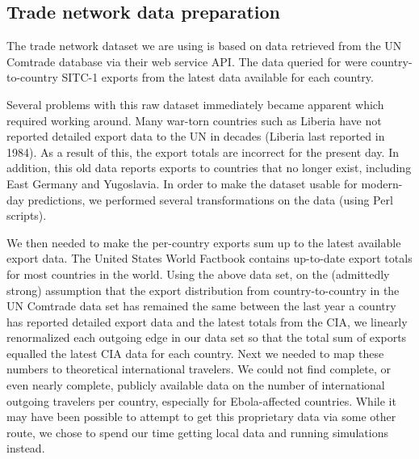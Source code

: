 \documentclass[10pt, journal,onecolumn]{IEEEtran}
\begin{document}
\subsection{{Trade network data preparation}}
\label{SubSec:TradeData}

The trade network dataset we are using is based on data retrieved from the
UN Comtrade database \citep{uncomtradedata} via their web service API.
The data queried for were country-to-country SITC-1 exports from the latest data available
for each country.

Several problems with this raw dataset immediately became apparent which required working around.
Many war-torn countries such as Liberia have not reported detailed export data
to the UN in decades (Liberia last reported in 1984). As a result of this, the export totals
are incorrect for the present day. In addition, this old data reports exports to countries that
no longer exist, including East Germany and Yugoslavia. In order to make the dataset usable for
modern-day predictions, we performed several transformations on the data (using Perl scripts).

We then needed to make the per-country exports sum up to the latest available export data.
The United States \citep{ciatotalexports} World Factbook contains up-to-date export totals
for most countries in the world. Using the above data set, on the (admittedly strong) assumption
that the export distribution
from country-to-country in the UN Comtrade data set has remained the same between the last year a
country has reported detailed export data and the latest totals from the CIA, we linearly renormalized
each outgoing edge in our data set so that the total sum of exports equalled the latest CIA data
for each country.
Next we needed to map these numbers to theoretical international travelers.
We could not find complete, or even nearly complete, publicly available data on the number of
international outgoing travelers per country, especially for Ebola-affected countries.
While it may have been possible to attempt to get this proprietary data via some other route,
we chose to spend our time getting local data and running simulations instead.
\end{document}
